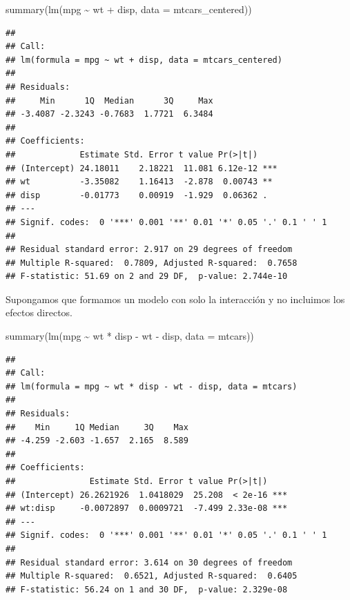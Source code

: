 \documentclass[
  12pt,
]{book}
\newenvironment{Shaded}{\begin{snugshade}}{\end{snugshade}}
\newcommand{\AttributeTok}[1]{\textcolor[rgb]{0.77,0.63,0.00}{#1}}
\newcommand{\FunctionTok}[1]{\textcolor[rgb]{0.00,0.00,0.00}{#1}}
\newcommand{\NormalTok}[1]{#1}
\newcommand{\SpecialCharTok}[1]{\textcolor[rgb]{0.00,0.00,0.00}{#1}}
\begin{document}
\begin{Shaded}
\begin{Highlighting}[]
\FunctionTok{summary}\NormalTok{(}\FunctionTok{lm}\NormalTok{(mpg }\SpecialCharTok{\textasciitilde{}}\NormalTok{ wt }\SpecialCharTok{+}\NormalTok{ disp, }\AttributeTok{data =}\NormalTok{ mtcars\_centered))}
\end{Highlighting}
\end{Shaded}

\begin{verbatim}
## 
## Call:
## lm(formula = mpg ~ wt + disp, data = mtcars_centered)
## 
## Residuals:
##     Min      1Q  Median      3Q     Max 
## -3.4087 -2.3243 -0.7683  1.7721  6.3484 
## 
## Coefficients:
##             Estimate Std. Error t value Pr(>|t|)    
## (Intercept) 24.18011    2.18221  11.081 6.12e-12 ***
## wt          -3.35082    1.16413  -2.878  0.00743 ** 
## disp        -0.01773    0.00919  -1.929  0.06362 .  
## ---
## Signif. codes:  0 '***' 0.001 '**' 0.01 '*' 0.05 '.' 0.1 ' ' 1
## 
## Residual standard error: 2.917 on 29 degrees of freedom
## Multiple R-squared:  0.7809, Adjusted R-squared:  0.7658 
## F-statistic: 51.69 on 2 and 29 DF,  p-value: 2.744e-10
\end{verbatim}

Supongamos que formamos un modelo con solo la interacción y no incluimos
los efectos directos.

\begin{Shaded}
\begin{Highlighting}[]
\FunctionTok{summary}\NormalTok{(}\FunctionTok{lm}\NormalTok{(mpg }\SpecialCharTok{\textasciitilde{}}\NormalTok{ wt }\SpecialCharTok{*}\NormalTok{ disp }\SpecialCharTok{{-}}\NormalTok{ wt }\SpecialCharTok{{-}}\NormalTok{ disp, }\AttributeTok{data =}\NormalTok{ mtcars))}
\end{Highlighting}
\end{Shaded}

\begin{verbatim}
## 
## Call:
## lm(formula = mpg ~ wt * disp - wt - disp, data = mtcars)
## 
## Residuals:
##    Min     1Q Median     3Q    Max 
## -4.259 -2.603 -1.657  2.165  8.589 
## 
## Coefficients:
##               Estimate Std. Error t value Pr(>|t|)    
## (Intercept) 26.2621926  1.0418029  25.208  < 2e-16 ***
## wt:disp     -0.0072897  0.0009721  -7.499 2.33e-08 ***
## ---
## Signif. codes:  0 '***' 0.001 '**' 0.01 '*' 0.05 '.' 0.1 ' ' 1
## 
## Residual standard error: 3.614 on 30 degrees of freedom
## Multiple R-squared:  0.6521, Adjusted R-squared:  0.6405 
## F-statistic: 56.24 on 1 and 30 DF,  p-value: 2.329e-08
\end{verbatim}
\end{document}
